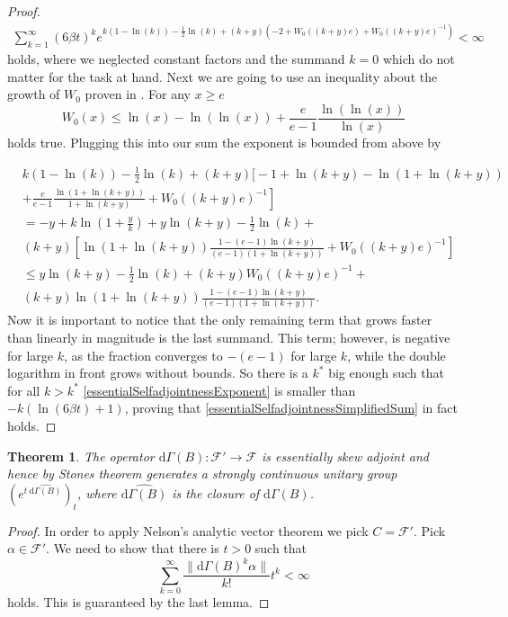 \documentclass[b5paper,draft,openbib,12pt]{memoir}
\newtheorem{Thm}[Def]{Theorem}
\begin{document}
\begin{proof}
\begin{align}\label{essentialSelfadjointnessSimplifiedSum}
\sum_{k=1}^\infty (6\beta t )^k   e^{k(1-\ln(k))-\frac{1}{2}\ln(k) +(k+y)(-2+W_0((k+y)e) + W_0((k+y)e)^{-1})}<\infty
\end{align}
holds, where we neglected constant factors and the summand \(k=0\) which do not matter for the task at hand. Next we are going
to use an inequality about the growth of \(W_0\) proven in \cite{hoorfar2008inequalities}. For any \(x\ge e\) 
\begin{equation}
W_0(x)\le \ln(x)-\ln( \ln (x)) + \frac{e}{e-1}\frac{\ln (\ln (x))}{\ln (x)}
\end{equation}
holds true. Plugging this into our sum the exponent is bounded from above by

\begin{align}\nonumber
&k(1-\ln(k))-\frac{1}{2}\ln(k) +(k+y)\Big[-1+\ln(k+y) - \ln(1+ \ln (k+y))\\ \nonumber
&\left.+\frac{e}{e-1} \frac{\ln(1+\ln(k+y))}{1+\ln(k+y)} + W_0((k+y)e)^{-1}\right]\\\nonumber
&=-y + k \ln\left(1+\frac{y}{k}\right) + y \ln (k+y) -\frac{1}{2}\ln(k) +\\\nonumber
&(k+y)\left[ \ln (1+\ln(k+y))\frac{1-(e-1)\ln(k+y)}{(e-1)(1+\ln(k+y))} + W_0((k+y)e)^{-1}\right]\\\label{essentialSelfadjointnessExponent}
&\le y \ln (k+y) -\frac{1}{2}\ln(k) + (k+y)W_0((k+y)e)^{-1} +\\\nonumber
&(k+y) \ln (1+\ln(k+y))\frac{1-(e-1)\ln(k+y)}{(e-1)(1+\ln(k+y))} .
\end{align}
Now it is important to notice that the only remaining term that grows faster than linearly in magnitude is the last summand.
This term; however, is negative for large \(k\), as the fraction converges to \(-(e-1)\) for large \(k\), while the double logarithm
in front grows without bounds. So there is a \(k^*\) big enough such that  for all \(k>k^*\) \eqref{essentialSelfadjointnessExponent} 
is smaller than \(- k (\ln(6\beta t) + 1)\), proving that \eqref{essentialSelfadjointnessSimplifiedSum} in fact holds.

\end{proof}



\begin{Thm}\label{Gamma essential selfadjointness}
The operator \(\mathrm{d}\Gamma(B):\mathcal{F}'\rightarrow \mathcal{F}\) is essentially skew adjoint and hence by Stones theorem
 generates a strongly continuous unitary group \(\left( e^{t ~\widehat{\mathrm{d}\Gamma(B)}}\right)_t\), where \(\widehat{\mathrm{d}\Gamma(B)}\) is the closure of 
 \(\mathrm{d}\Gamma(B)\).
\end{Thm}
\begin{proof}
In order to apply Nelson's analytic vector theorem we pick \(C=\mathcal{F}'\). Pick \(\alpha \in\mathcal{F}'\). We need to show that there is \(t>0\) such that
\begin{equation}
\sum_{k=0}^\infty \frac{\|\mathrm{d}\Gamma(B)^k \alpha\|}{k!} t^k <\infty
\end{equation}
holds. This is guaranteed by the last lemma.
\end{proof}
\end{document}
